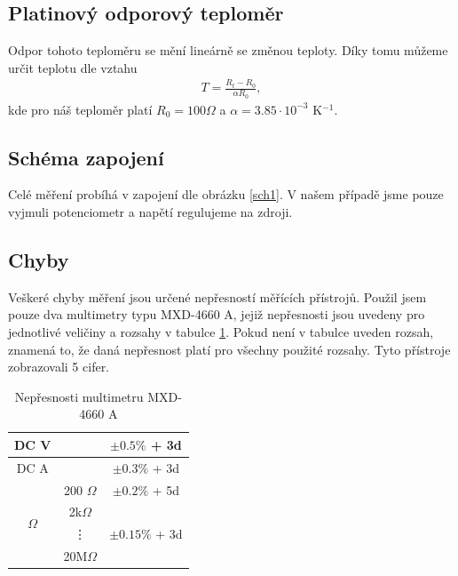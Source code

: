 \documentclass[a4paper,12pt]{article}
\begin{document}
\subsection{Platinový odporový teploměr}
Odpor tohoto teploměru se mění lineárně se změnou teploty. Díky tomu můžeme určit teplotu dle vztahu
\begin{eqnarray}
T=\frac{R_t-R_0}{\alpha R_0},
\end{eqnarray}
kde pro náš teploměr platí $R_0 = 100 \Omega$ a $\alpha = 3.85\cdot10^{-3}$ K$^{-1}$.

\subsection{Schéma zapojení}
Celé měření probíhá v zapojení dle obrázku \ref{sch1}. V našem případě jsme pouze vyjmuli potenciometr a napětí regulujeme na zdroji.

\subsection{Chyby}
Veškeré chyby měření jsou určené nepřesností měřících přístrojů. Použil jsem pouze dva multimetry typu MXD-4660 A, jejiž nepřesnosti 
jsou uvedeny pro jednotlivé veličiny a rozsahy v tabulce \ref{TChyby}. Pokud není v tabulce uveden rozsah, znamená to, že daná nepřesnost platí pro všechny 
použité rozsahy. Tyto přístroje zobrazovali 5 cifer.

\begin{table}
\begin{center}
\begin{tabular}{|c|c|c|}
\hline
DC V&   &   $\pm 0.5 \%$ + 3d \\ \hline
DC A&   &   $\pm 0.3 \%$ + 3d \\ \hline
\multirow{4}{*}{$\Omega$}&   200 $\Omega$&   $\pm 0.2 \%$ + 5d \\ \cline{2-3}
&   2k$\Omega$& \multirow{3}{*}{$\pm 0.15 \%$ + 3d} \\
&   \vdots&  \\ 
&   20M$\Omega$& \\ \hline
\end{tabular}
\end{center}
\caption{Nepřesnosti multimetru MXD-4660 A}
\label{TChyby}
\end{table}
\end{document}
